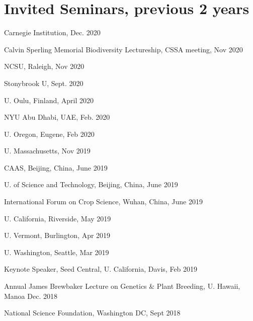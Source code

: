 \documentclass[letterpaper,10pt]{article}
\renewenvironment{itemize}{
  \begin{list}{}{
    \setlength{\leftmargin}{1.5em}
  }
}{
  \end{list}
}
\begin{document}
\section*{Invited Seminars, previous 2 years}
\begin{itemize}
\setlength\itemsep{0ex}
\item Carnegie Institution, Dec. 2020
\item Calvin Sperling Memorial Biodiversity Lectureship, CSSA meeting, Nov 2020
\item NCSU, Raleigh, Nov 2020
\item Stonybrook U, Sept. 2020
\item U. Oulu, Finland, April 2020
\item NYU Abu Dhabi, UAE, Feb. 2020
\item U. Oregon, Eugene, Feb 2020
\item U. Massachusetts, Nov 2019
\item CAAS, Beijing, China, June 2019
\item U. of Science and Technology, Beijing, China, June 2019
\item International Forum on Crop Science, Wuhan, China, June 2019
\item U. California, Riverside, May 2019
\item U. Vermont, Burlington, Apr 2019
\item U. Washington, Seattle, Mar 2019
\item Keynote Speaker, Seed Central, U. California, Davis, Feb 2019
\item Annual James Brewbaker Lecture on Genetics \& Plant Breeding, U. Hawaii, Manoa Dec. 2018
\item National Science Foundation, Washington DC, Sept 2018

\end{itemize}
\end{document}
